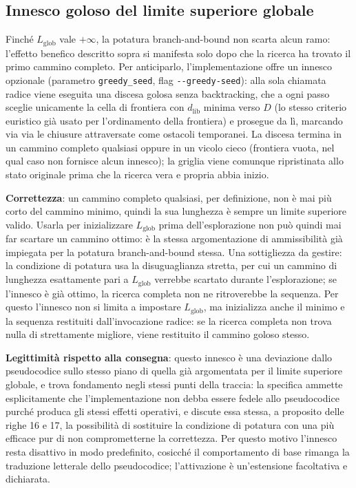 \subsection{Innesco goloso del limite superiore globale}\label{secc:innescogoloso}

Finché $L_{\text{glob}}$ vale $+\infty$, la potatura branch-and-bound non scarta alcun ramo: l'effetto benefico descritto sopra si manifesta solo dopo che la ricerca ha trovato il primo cammino completo. Per anticiparlo, l'implementazione offre un innesco opzionale (parametro \texttt{greedy\_seed}, flag \texttt{-{}-greedy-seed}): alla sola chiamata radice viene eseguita una discesa golosa senza backtracking, che a ogni passo sceglie unicamente la cella di frontiera con $d_{\text{lib}}$ minima verso $D$ (lo stesso criterio euristico già usato per l'ordinamento della frontiera) e prosegue da lì, marcando via via le chiusure attraversate come ostacoli temporanei. La discesa termina in un cammino completo qualsiasi oppure in un vicolo cieco (frontiera vuota, nel qual caso non fornisce alcun innesco); la griglia viene comunque ripristinata allo stato originale prima che la ricerca vera e propria abbia inizio.

\textbf{Correttezza}: un cammino completo qualsiasi, per definizione, non è mai più corto del cammino minimo, quindi la sua lunghezza è sempre un limite superiore valido. Usarla per inizializzare $L_{\text{glob}}$ prima dell'esplorazione non può quindi mai far scartare un cammino ottimo: è la stessa argomentazione di ammissibilità già impiegata per la potatura branch-and-bound stessa. Una sottigliezza da gestire: la condizione di potatura usa la disuguaglianza stretta, per cui un cammino di lunghezza esattamente pari a $L_{\text{glob}}$ verrebbe scartato durante l'esplorazione; se l'innesco è già ottimo, la ricerca completa non ne ritroverebbe la sequenza. Per questo l'innesco non si limita a impostare $L_{\text{glob}}$, ma inizializza anche il minimo e la sequenza restituiti dall'invocazione radice: se la ricerca completa non trova nulla di strettamente migliore, viene restituito il cammino goloso stesso.

\textbf{Legittimità rispetto alla consegna}: questo innesco è una deviazione dallo pseudocodice sullo stesso piano di quella già argomentata per il limite superiore globale, e trova fondamento negli stessi punti della traccia: la specifica ammette esplicitamente che l'implementazione non debba essere fedele allo pseudocodice purché produca gli stessi effetti operativi, e discute essa stessa, a proposito delle righe 16 e 17, la possibilità di sostituire la condizione di potatura con una più efficace pur di non comprometterne la correttezza. Per questo motivo l'innesco resta disattivo in modo predefinito, cosicché il comportamento di base rimanga la traduzione letterale dello pseudocodice; l'attivazione è un'estensione facoltativa e dichiarata.

